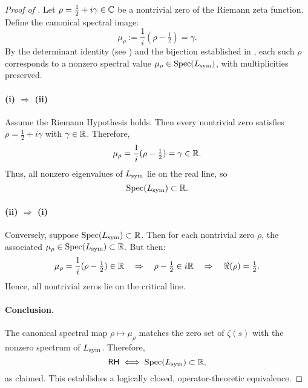 \begin{proof}[Proof of ]
Let \( \rho = \tfrac{1}{2} + i\gamma \in \mathbb{C} \) be a nontrivial zero of the Riemann zeta function. Define the canonical spectral image:
\[
\mu_\rho := \frac{1}{i}(\rho - \tfrac{1}{2}) = \gamma.
\]
By the determinant identity (see ) and the bijection established in , each such \( \rho \) corresponds to a nonzero spectral value \( \mu_\rho \in \operatorname{Spec}(L_{\mathrm{sym}}) \), with multiplicities preserved.

\paragraph{(i) \( \Rightarrow \) (ii)}
Assume the Riemann Hypothesis holds. Then every nontrivial zero satisfies \( \rho = \tfrac{1}{2} + i\gamma \) with \( \gamma \in \mathbb{R} \). Therefore,
\[
\mu_\rho = \frac{1}{i}(\rho - \tfrac{1}{2}) = \gamma \in \mathbb{R}.
\]
Thus, all nonzero eigenvalues of \( L_{\mathrm{sym}} \) lie on the real line, so
\[
\operatorname{Spec}(L_{\mathrm{sym}}) \subset \mathbb{R}.
\]

\paragraph{(ii) \( \Rightarrow \) (i)}
Conversely, suppose \( \operatorname{Spec}(L_{\mathrm{sym}}) \subset \mathbb{R} \). Then for each nontrivial zero \( \rho \), the associated \( \mu_\rho \in \operatorname{Spec}(L_{\mathrm{sym}}) \subset \mathbb{R} \). But then:
\[
\mu_\rho = \frac{1}{i}(\rho - \tfrac{1}{2}) \in \mathbb{R} \quad \Rightarrow \quad \rho - \tfrac{1}{2} \in i\mathbb{R} \quad \Rightarrow \quad \Re(\rho) = \tfrac{1}{2}.
\]
Hence, all nontrivial zeros lie on the critical line.

\paragraph{Conclusion.}
The canonical spectral map \( \rho \mapsto \mu_\rho \) matches the zero set of \( \zeta(s) \) with the nonzero spectrum of \( L_{\mathrm{sym}} \). Therefore,
\[
\mathsf{RH} \iff \operatorname{Spec}(L_{\mathrm{sym}}) \subset \mathbb{R},
\]
as claimed. This establishes a logically closed, operator-theoretic equivalence.
\end{proof}
